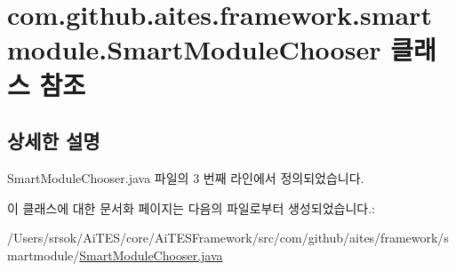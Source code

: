 \hypertarget{classcom_1_1github_1_1aites_1_1framework_1_1smartmodule_1_1_smart_module_chooser}{}\section{com.\+github.\+aites.\+framework.\+smartmodule.\+Smart\+Module\+Chooser 클래스 참조}
\label{classcom_1_1github_1_1aites_1_1framework_1_1smartmodule_1_1_smart_module_chooser}


\subsection{상세한 설명}


Smart\+Module\+Chooser.\+java 파일의 3 번째 라인에서 정의되었습니다.



이 클래스에 대한 문서화 페이지는 다음의 파일로부터 생성되었습니다.\+:\begin{DoxyCompactItemize}
\item 
/\+Users/srsok/\+Ai\+T\+E\+S/core/\+Ai\+T\+E\+S\+Framework/src/com/github/aites/framework/smartmodule/\mbox{\hyperlink{_smart_module_chooser_8java}{Smart\+Module\+Chooser.\+java}}\end{DoxyCompactItemize}
